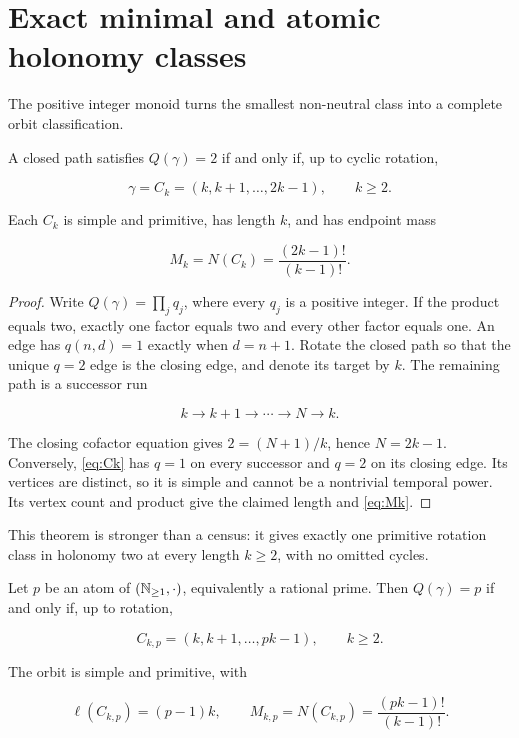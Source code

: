 \section{Exact minimal and atomic holonomy classes}
\label{sec:atomic}

The positive integer monoid turns the smallest non-neutral class into a
complete orbit classification.

\begin{theorem}
\label{thm:q2}
A closed path satisfies \(Q(\gamma)=2\) if and only if, up to cyclic
rotation,

\begin{equation}
 \gamma=C_k=(k,k+1,\ldots,2k-1),
 \qquad k\ge2.
\label{eq:Ck}
\end{equation}

Each \(C_k\) is simple and primitive, has length \(k\), and has endpoint mass

\begin{equation}
 M_k=N(C_k)=\frac{(2k-1)!}{(k-1)!}.
\label{eq:Mk}
\end{equation}
\end{theorem}

\begin{proof}
Write \(Q(\gamma)=\prod_jq_j\), where every \(q_j\) is a positive integer.
If the product equals two, exactly one factor equals two and every other
factor equals one.  An edge has \(q(n,d)=1\) exactly when \(d=n+1\).
Rotate the closed path so that the unique \(q=2\) edge is the closing edge,
and denote its target by \(k\).  The remaining path is a successor run

\[
 k\to k+1\to\cdots\to N\to k.
\]

The closing cofactor equation gives \(2=(N+1)/k\), hence \(N=2k-1\).
Conversely, \cref{eq:Ck} has \(q=1\) on every successor and \(q=2\) on its
closing edge.  Its vertices are distinct, so it is simple and cannot be a
nontrivial temporal power.  Its vertex count and product give the claimed
length and \cref{eq:Mk}.
\end{proof}

This theorem is stronger than a census: it gives exactly one primitive
rotation class in holonomy two at every length \(k\ge2\), with no omitted
cycles.

\begin{theorem}
\label{thm:atomic}
Let \(p\) be an atom of \((\mathbb N_{\ge1},\cdot)\), equivalently a rational prime.
Then \(Q(\gamma)=p\) if and only if, up to rotation,

\begin{equation}
 C_{k,p}=(k,k+1,\ldots,pk-1),
 \qquad k\ge2.
\label{eq:Ckp}
\end{equation}

The orbit is simple and primitive, with

\begin{equation}
 \ell(C_{k,p})=(p-1)k,
 \qquad
 M_{k,p}=N(C_{k,p})=\frac{(pk-1)!}{(k-1)!}.
\label{eq:Mkp}
\end{equation}
\end{theorem}


